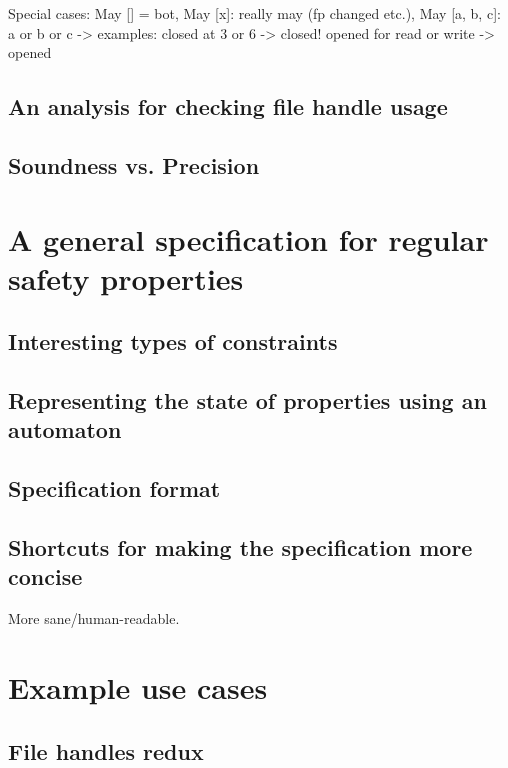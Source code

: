 Special cases: May [] = bot, May [x]: really may (fp changed etc.), May [a, b, c]: a or b or c
-> examples:
	closed at 3 or 6 -> closed!
	opened for read or write -> opened



\section{An analysis for checking file handle usage}

\section{Soundness vs. Precision}


\chapter{A general specification for regular safety properties}
\section{Interesting types of constraints}

\section{Representing the state of properties using an automaton}

\section{Specification format}

\section{Shortcuts for making the specification more concise}
More sane/human-readable.


\chapter{Example use cases}

\section{File handles redux}

